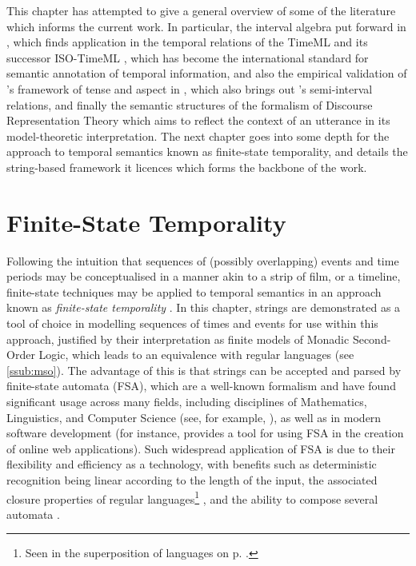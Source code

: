 \documentclass[a4paper,12pt,leqno]{article}
\begin{document}

This chapter has attempted to give a general overview of some of the literature which informs the current work. In particular, the interval algebra put forward in \citet{allen1983maintaining}, which finds application in the temporal relations of the TimeML \citep{timeml2005timeml} and its successor ISO-TimeML \citep{pustejovsky2010iso}, which has become the international standard for semantic annotation of temporal information, and also the empirical validation of \citet{reichenbach1947elements}'s framework of tense and aspect in \citet{Derczynski2013}, which also brings out \citet{Freksa1992}'s semi-interval relations, and finally the semantic structures of the formalism of Discourse Representation Theory \citep{kamp1981theory} which aims to reflect the context of an utterance in its model-theoretic interpretation. The next chapter goes into some depth for the approach to temporal semantics known as finite-state temporality, and details the string-based framework it licences which forms the backbone of the work.

\newpage
\section{Finite-State Temporality}\label{sec:fst}
Following the intuition that sequences of (possibly overlapping) events and time periods may be conceptualised in a manner akin to a strip of film, or a timeline, finite-state techniques may be applied to temporal semantics in an approach known as \textit{finite-state temporality} \citep{fernando2005entailments}. In this chapter, strings are demonstrated as a tool of choice in modelling sequences of times and events for use within this approach, justified by their interpretation as finite models of Monadic Second-Order Logic, which leads to an equivalence with regular languages (see \cref{ssub:mso}). The advantage of this is that strings can be accepted and parsed by finite-state automata (FSA), which are a well-known formalism and have found significant usage across many fields, including disciplines of Mathematics, Linguistics, and Computer Science (see, for example, \citet{buchner1993finite,veanes2012symbolic}), as well as in modern software development (for instance, \citet{khourshid_2015} provides a tool for using FSA in the creation of online web applications). Such widespread application of FSA is due to their flexibility and efficiency as a technology, with benefits such as deterministic recognition being linear according to the length of the input, the associated closure properties of regular languages\footnote{Seen in the superposition of languages on p. \pageref{def:lang-superposition}.}%
, and the ability to compose several automata \citep{wintner2007finite}.
\end{document}
